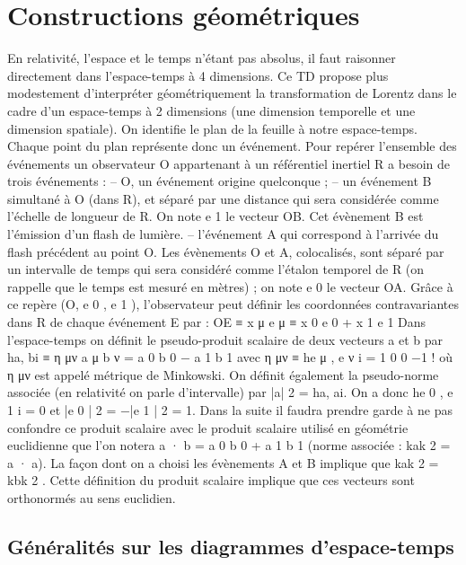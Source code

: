 
\section{Constructions géométriques}%
En relativité, l’espace et le temps n’étant pas absolus, il faut raisonner directement dans
l’espace-temps à 4 dimensions. Ce TD propose plus modestement d’interpréter géométriquement
la transformation de Lorentz dans le cadre d’un espace-temps à 2 dimensions (une dimension
temporelle et une dimension spatiale).
On identifie le plan de la feuille à notre espace-temps. Chaque point du plan représente donc
un événement. Pour repérer l’ensemble des événements un observateur O appartenant à un
référentiel inertiel R a besoin de trois événements :
– O, un événement origine quelconque ;
– un événement B simultané à O (dans R), et séparé par une distance qui sera considérée
comme l’échelle de longueur de R. On note e 1 le vecteur OB. Cet évènement B est l’émission
d’un flash de lumière.
– l’événement A qui correspond à l’arrivée du flash précédent au point O. Les évènements O
et A, colocalisés, sont séparé par un intervalle de temps qui sera considéré comme l’étalon
temporel de R (on rappelle que le temps est mesuré en mètres) ; on note e 0 le vecteur OA.
Grâce à ce repère (O, e 0 , e 1 ), l’observateur peut définir les coordonnées contravariantes dans R
de chaque événement E par :
OE ≡ x μ e μ ≡ x 0 e 0 + x 1 e 1
Dans l’espace-temps on définit le pseudo-produit scalaire de deux vecteurs a et b par
ha, bi ≡ η μν
a μ b ν
=
a 0 b 0
−
a 1 b 1
avec
η μν ≡ he μ , e ν i =
1 0
0 −1
!
où η μν est appelé métrique de Minkowski. On définit également la pseudo-norme associée (en
relativité on parle d’intervalle) par |a| 2 = ha, ai. On a donc he 0 , e 1 i = 0 et |e 0 | 2 = −|e 1 | 2 = 1.
Dans la suite il faudra prendre garde à ne pas confondre ce produit scalaire avec le produit
scalaire utilisé en géométrie euclidienne que l’on notera a · b = a 0 b 0 + a 1 b 1 (norme associée :
kak 2 = a · a). La façon dont on a choisi les évènements A et B implique que kak 2 = kbk 2 . Cette
définition du produit scalaire implique que ces vecteurs sont orthonormés au sens euclidien.
\subsection{Généralités sur les diagrammes d’espace-temps}%

